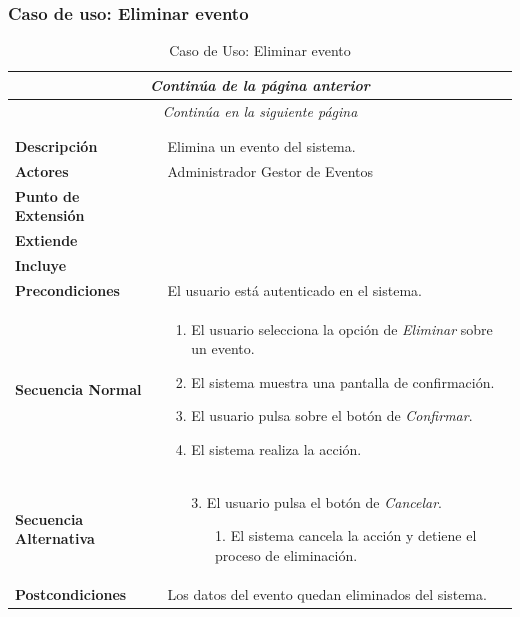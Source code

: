 \subsubsection*{Caso de uso: Eliminar evento }
\begin{longtable}{| p{4cm} | p{10cm} |}
\endfirsthead
\multicolumn{2}{c}{\textit{Continúa de la página anterior}}\\[12pt]
\hline
\endhead
\hline
\multicolumn{2}{c}{\textit{Continúa en la siguiente página}} \\
\endfoot
\hline
\caption{Caso de Uso: Eliminar evento}\label{fig:1}\\
\endlastfoot


\hline
\multicolumn{2}{|c|}{\textbf{CU$<$41$>$ - Eliminar Evento}} \\

\hline
\textbf{Descripción} &
Elimina un evento del sistema.\\

\hline
\textbf{Actores} &
Administrador\newline
Gestor de Eventos\\

\hline
\textbf{Punto de Extensión} &
\\

\hline
\textbf{Extiende} &
\\

\hline
\textbf{Incluye} &
\\

\hline
\textbf{Precondiciones} &
El usuario está autenticado en el sistema.\\

\hline
\textbf{Secuencia Normal} &\mbox{}\par\vspace{-\baselineskip}
\begin{enumerate}[leftmargin=0.7cm, topsep=0.1cm]
\item El usuario selecciona la opción de \textit{Eliminar} sobre un evento.
\item El sistema muestra una pantalla de confirmación.
\item El usuario pulsa sobre el botón de \textit{Confirmar}.
\item El sistema realiza la acción.
\end{enumerate}


\\
\hline
\textbf{Secuencia Alternativa} &\mbox{}\par\vspace{-\baselineskip}
\begin{enumerate}[leftmargin=0.9cm, topsep=0.1cm]
\item[3.] El usuario pulsa el botón de \textit{Cancelar}.
	\begin{itemize}
	\item[1.] El sistema cancela la acción y detiene el proceso de eliminación.
	\end{itemize}
\end{enumerate}
\\

\hline
\textbf{Postcondiciones} & 
Los datos del evento quedan eliminados del sistema.\\
\hline
\end{longtable}
